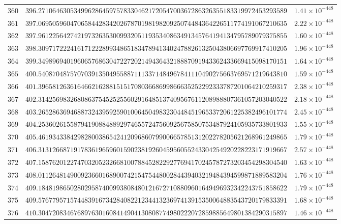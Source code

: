 \documentclass[12pt,reqno]{amsart}
\theoremstyle{remark}
\begin{document}
\begin{longtable}{clc}
$360$ & $396.2710646305349962864597578330462172054700367286326355183319972453293589$ & $1.41\times 10^{-448}$ \\
$361$ & $397.0695059604706584428342026787019819820925074484364226511774191067210635$ & $2.22\times 10^{-448}$ \\
$362$ & $397.9612256427421973263530099320511935340863491345764194134795789079375855$ & $1.60\times 10^{-448}$ \\
$363$ & $398.3097172224161712228993486518347894134024788261325043806697769917410205$ & $1.96\times 10^{-448}$ \\
$364$ & $399.3498969401960657686304722720214943643218887091943362433669415098170151$ & $1.64\times 10^{-448}$ \\
$365$ & $400.5408704875707039135049558871113371484967841110490275663769571219643810$ & $1.59\times 10^{-448}$ \\
$366$ & $401.3965812636164662162881515170803668699866635252292333787201064210259317$ & $2.38\times 10^{-448}$ \\
$367$ & $402.3142569832680863754525255602916485137409567611208988807361057203040522$ & $2.18\times 10^{-448}$ \\
$368$ & $403.2652863694688732439592590100645049832304484519653372061225382496101774$ & $2.45\times 10^{-448}$ \\
$369$ & $404.2536026155879419088488929746557247560925675850753487924105935733801933$ & $1.55\times 10^{-448}$ \\
$370$ & $405.4619343384298280038654241209686079900665785131202278205621268961249865$ & $1.79\times 10^{-448}$ \\
$371$ & $406.3131266871917836196596015902381926045956055243304254920228223171919667$ & $2.57\times 10^{-448}$ \\
$372$ & $407.1587620122747032052326681007884528229277694170245787273203454298304540$ & $1.63\times 10^{-448}$ \\
$373$ & $408.0112648149009236601689007421547544800284439403219484394599871889583204$ & $1.76\times 10^{-448}$ \\
$374$ & $409.1848198650280295874009938084801216727108809601649496932342243751858622$ & $1.79\times 10^{-448}$ \\
$375$ & $409.5767795715744839167342840822123441323697413915350064883543720179833391$ & $1.68\times 10^{-448}$ \\
$376$ & $410.3047208346768976301608414904130808774980222072859885649801384290315897$ & $1.46\times 10^{-448}$ \\

\end{longtable}
\end{document}
